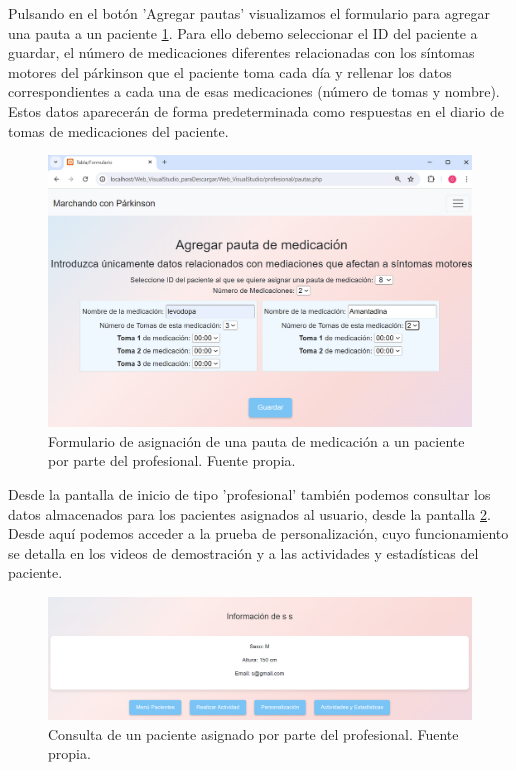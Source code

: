 Pulsando en el botón 'Agregar pautas' visualizamos el formulario para agregar una pauta a un paciente \ref{fig:pautasprof}. Para ello debemo seleccionar el ID del paciente a guardar, el número de medicaciones diferentes relacionadas con los síntomas motores del párkinson que el paciente toma cada día y rellenar los datos correspondientes a cada una de esas medicaciones (número de tomas y nombre). Estos datos aparecerán de forma predeterminada como respuestas en el diario de tomas de medicaciones del paciente.

\begin{figure}[h]
    \centering
    \includegraphics[width=1\textwidth]{img/pautasprof.png}
    \caption{Formulario de asignación de una pauta de medicación a un paciente por parte del profesional. Fuente propia.}
    \label{fig:pautasprof}
\end{figure}
Desde la pantalla de inicio de tipo 'profesional' también podemos consultar los datos almacenados para los pacientes asignados al usuario, desde la pantalla \ref{fig:profverpaciente}. Desde aquí podemos acceder a la prueba de personalización, cuyo funcionamiento se detalla en los videos de demostración y a las actividades y estadísticas del paciente. 

\begin{figure}[h]
    \centering
    \includegraphics[width=1\textwidth]{img/profverpaciente.png}
    \caption{Consulta de un paciente asignado por parte del profesional. Fuente propia.}
    \label{fig:profverpaciente}
\end{figure}

